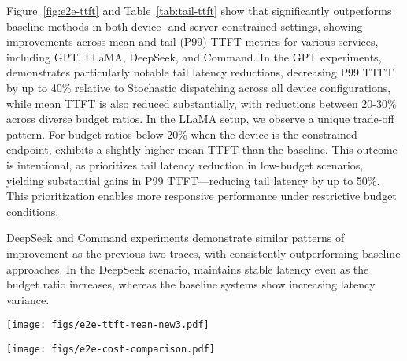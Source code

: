 Figure~\ref{fig:e2e-ttft} and Table~\ref{tab:tail-ttft} show that \disco{} significantly outperforms baseline methods in both device- and server-constrained settings, showing improvements across mean and tail (P99) TTFT metrics for various services, including GPT, LLaMA, DeepSeek, and Command. In the GPT experiments, \disco{} demonstrates particularly notable tail latency reductions, decreasing P99 TTFT by up to 40\% relative to Stochastic dispatching across all device configurations, while mean TTFT is also reduced substantially, with reductions between 20-30\% across diverse budget ratios.
In the LLaMA setup, we observe a unique trade-off pattern. For budget ratios below 20\% when the device is the constrained endpoint, \disco{} exhibits a slightly higher mean TTFT than the baseline. This outcome is intentional, as \disco{} prioritizes tail latency reduction in low-budget scenarios, yielding substantial gains in P99 TTFT—reducing tail latency by up to 50\%. This prioritization enables more responsive performance under restrictive budget conditions.

DeepSeek and Command experiments demonstrate similar patterns of improvement as the previous two traces, with \disco{} consistently outperforming baseline approaches. In the DeepSeek scenario, \disco{} maintains stable latency even as the budget ratio increases, whereas the baseline systems show increasing latency variance. 

\begin{figure*}[t]
    \centering
    \texttt{[image: figs/e2e-ttft-mean-new3.pdf]}
    \vskip -0.1in
    \caption{Mean TTFT tested using four traces. \disco{} achieves superior TTFT performance than the baselines.
    }
    \vskip -0.1in
    \label{fig:e2e-ttft}
\end{figure*}

 \begin{figure*}[t]
     \centering
     \texttt{[image: figs/e2e-cost-comparison.pdf]}
     \vskip -0.1in
     \caption{The migration mechanism in \disco{} achieves superior end-to-end cost.
     }
     \vskip -0.1in
     \label{fig:e2e-cost}
\end{figure*}

